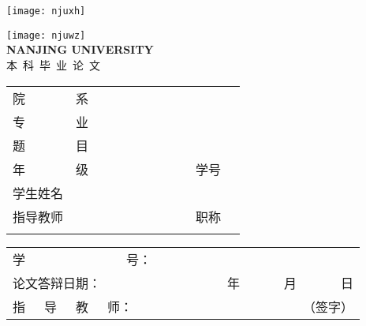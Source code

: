 \begin{titlepage}
\texttt{[image: njuxh]}
\parbox[t][0.5cm][t]{\textwidth}{}
\begin{center}
	
\parbox[t][7.2cm][t]{\textwidth}{
\begin{center}
\texttt{[image: njuwz]}\\
{\bf \Large NANJING UNIVERSITY\\}
\vspace{0.3cm}
{\erhao 本~科~毕~业~论~文\\}
\end{center}
}

\parbox[t][6cm][c]{\textwidth}{
\begin{center}
\fontsize{16pt}{8pt}\selectfont
\begin{tabular}{p{4.5em} p{2em} p{4em} p{2.5em} p{6em}}
院~~~~~~~~系 & \multicolumn{4}{c}{}\\
\cmidrule(r){2-5}\addlinespace[10pt]
专~~~~~~~~业 & \multicolumn{4}{c}{}\\
\cmidrule(r){2-5}\addlinespace[10pt]
题~~~~~~~~目 &  \multicolumn{4}{c}{}\\
\cmidrule(r){2-5}\addlinespace[10pt]
年~~~~~~~~级 &  \multicolumn{2}{c}{~~~~~~~~~~~~~} & 学号 & \\
\cmidrule(r){2-3} \cmidrule(r){5-5}\addlinespace[10pt]
学生姓名 & \multicolumn{4}{c}{}\\
\cmidrule(r){2-5}\addlinespace[10pt]
指导教师 & \multicolumn{2}{c}{} & 职称 & \\
\cmidrule(r){2-3} \cmidrule(r){5-5}\addlinespace[10pt]
\multicolumn{2}{l}{论文提交日期} & \multicolumn{3}{c}{}\\
\cmidrule(r){3-5}
\end{tabular}
\end{center}
}

\newpage
 \parbox[t][16cm][t]{\textwidth}{
\begin{center} 
\end{center} 
}
          
\parbox[b][10em][b]{\textwidth}{ \sanhao                                                                  
\begin{tabular}{l p{12em}}
学~~~~~~~~~~~~~~~~号：& {\bf ~~~~}\\
论文答辩日期：& ~~~~~~~~~~年~~~~~~~月~~~~~~~日\\
指~~~导~~~教~~~师： &~~~~~~~~~~~~~~~~~~~~~~（签字）\\
\end{tabular}
}   
\end{center}

\end{titlepage}